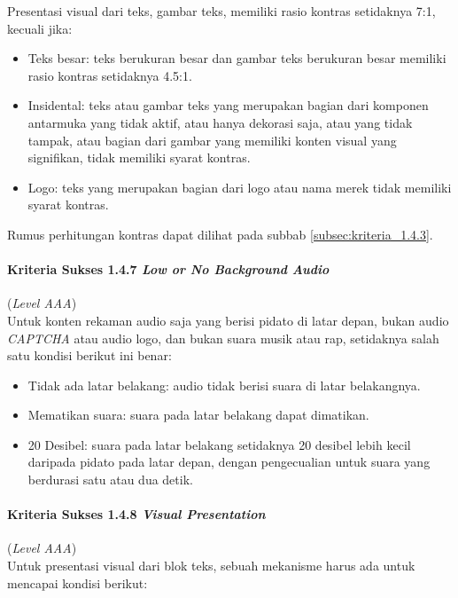 Presentasi visual dari teks, gambar teks, memiliki rasio kontras setidaknya 7:1, kecuali jika:

\begin{itemize}
	\item Teks besar: teks berukuran besar dan gambar teks berukuran besar memiliki rasio kontras setidaknya 4.5:1.
	\item Insidental: teks atau gambar teks yang merupakan bagian dari komponen antarmuka yang tidak aktif, atau hanya dekorasi saja, atau yang tidak tampak, atau bagian dari gambar yang memiliki konten visual yang signifikan, tidak memiliki syarat kontras.
	\item Logo: teks yang merupakan bagian dari logo atau nama merek tidak memiliki syarat kontras.
\end{itemize}

Rumus perhitungan kontras dapat dilihat pada subbab \ref{subsec:kriteria_1.4.3}.

\paragraph{Kriteria Sukses 1.4.7 \textit{Low or No Background Audio}}
\label{subsec:kriteria_1.4.7}
(\textit{Level AAA}) \\

Untuk konten rekaman audio saja yang berisi pidato di latar depan, bukan audio \textit{CAPTCHA} atau audio logo, dan bukan suara musik atau rap, setidaknya salah satu kondisi berikut ini benar: 

\begin{itemize}
	\item Tidak ada latar belakang: audio tidak berisi suara di latar belakangnya.
	\item Mematikan suara: suara pada latar belakang dapat dimatikan.
	\item 20 Desibel: suara pada latar belakang setidaknya 20 desibel lebih kecil daripada pidato pada latar depan, dengan pengecualian untuk suara yang berdurasi satu atau dua detik.
\end{itemize}

\paragraph{Kriteria Sukses 1.4.8 \textit{Visual Presentation}}
\label{subsec:kriteria_1.4.8}
(\textit{Level AAA}) \\

Untuk presentasi visual dari blok teks, sebuah mekanisme harus ada untuk mencapai kondisi berikut:


